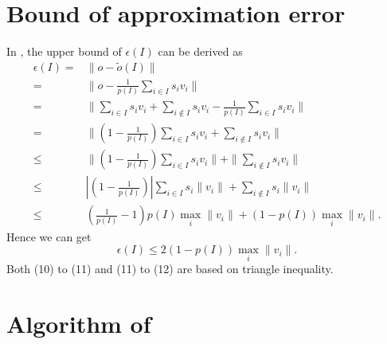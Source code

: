 \newpage
\appendix
\section{Bound of approximation error}
\label{sec:appendix-bound-proof}

In , the upper bound of $\epsilon(I)$ can be derived as
\begin{align}
    \epsilon(I)=&\|o-\tilde{o}(I)\| \\
    =&\|o-\frac{1}{p(I)}\sum_{i\in I}s_iv_i\|\\
    =&\|\sum_{i\in I}s_iv_i+\sum_{i\notin I}s_iv_i-\frac{1}{p(I)}\sum_{i\in I}s_iv_i\|\\
    =&\|\left(1-\frac{1}{p(I)}\right)\sum_{i\in I}s_iv_i+\sum_{i\notin I}s_iv_i\|\\
    \leq&\|\left(1-\frac{1}{p(I)}\right)\sum_{i\in I}s_iv_i\|+ \|\sum_{i\notin I}s_iv_i\|\\
    \leq&\left|\left(1-\frac{1}{p(I)}\right)\right|\sum_{i\in I}s_i\|v_i\| + \sum_{i\notin I}s_i\|v_i\|\\
    \leq&\left(\frac{1}{p(I)}-1\right)p(I)\max_i\|v_i\|+(1-p(I))\max_i\|v_i\| .
\end{align}
Hence we can get
\begin{equation}
    \epsilon(I)\leq 2(1-p(I))\max_i\|v_i\| .
\end{equation}
Both (10) to (11) and (11) to (12) are based on triangle inequality.

\section{Algorithm of \DF}
 







